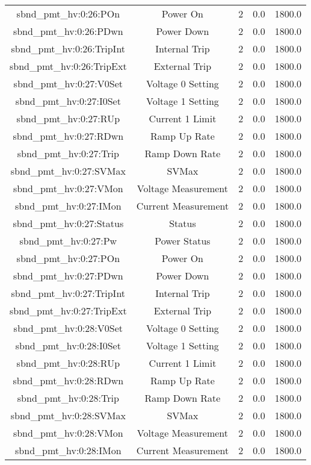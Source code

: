 \begin{center}
\begin{longtable}{c | c c c c }
sbnd\_pmt\_hv:0:26:POn & Power On & 2 & 0.0 & 1800.0\\ 
sbnd\_pmt\_hv:0:26:PDwn & Power Down & 2 & 0.0 & 1800.0\\ 
sbnd\_pmt\_hv:0:26:TripInt & Internal Trip & 2 & 0.0 & 1800.0\\ 
sbnd\_pmt\_hv:0:26:TripExt & External Trip & 2 & 0.0 & 1800.0\\ 
sbnd\_pmt\_hv:0:27:V0Set & Voltage 0 Setting & 2 & 0.0 & 1800.0\\ 
sbnd\_pmt\_hv:0:27:I0Set & Voltage 1 Setting & 2 & 0.0 & 1800.0\\ 
sbnd\_pmt\_hv:0:27:RUp & Current 1 Limit & 2 & 0.0 & 1800.0\\ 
sbnd\_pmt\_hv:0:27:RDwn & Ramp Up Rate & 2 & 0.0 & 1800.0\\ 
sbnd\_pmt\_hv:0:27:Trip & Ramp Down Rate & 2 & 0.0 & 1800.0\\ 
sbnd\_pmt\_hv:0:27:SVMax & SVMax & 2 & 0.0 & 1800.0\\ 
sbnd\_pmt\_hv:0:27:VMon & Voltage Measurement & 2 & 0.0 & 1800.0\\ 
sbnd\_pmt\_hv:0:27:IMon & Current Measurement & 2 & 0.0 & 1800.0\\ 
sbnd\_pmt\_hv:0:27:Status & Status & 2 & 0.0 & 1800.0\\ 
sbnd\_pmt\_hv:0:27:Pw & Power Status & 2 & 0.0 & 1800.0\\ 
sbnd\_pmt\_hv:0:27:POn & Power On & 2 & 0.0 & 1800.0\\ 
sbnd\_pmt\_hv:0:27:PDwn & Power Down & 2 & 0.0 & 1800.0\\ 
sbnd\_pmt\_hv:0:27:TripInt & Internal Trip & 2 & 0.0 & 1800.0\\ 
sbnd\_pmt\_hv:0:27:TripExt & External Trip & 2 & 0.0 & 1800.0\\ 
sbnd\_pmt\_hv:0:28:V0Set & Voltage 0 Setting & 2 & 0.0 & 1800.0\\ 
sbnd\_pmt\_hv:0:28:I0Set & Voltage 1 Setting & 2 & 0.0 & 1800.0\\ 
sbnd\_pmt\_hv:0:28:RUp & Current 1 Limit & 2 & 0.0 & 1800.0\\ 
sbnd\_pmt\_hv:0:28:RDwn & Ramp Up Rate & 2 & 0.0 & 1800.0\\ 
sbnd\_pmt\_hv:0:28:Trip & Ramp Down Rate & 2 & 0.0 & 1800.0\\ 
sbnd\_pmt\_hv:0:28:SVMax & SVMax & 2 & 0.0 & 1800.0\\ 
sbnd\_pmt\_hv:0:28:VMon & Voltage Measurement & 2 & 0.0 & 1800.0\\ 
sbnd\_pmt\_hv:0:28:IMon & Current Measurement & 2 & 0.0 & 1800.0\\ 

\end{longtable}
\end{center}
